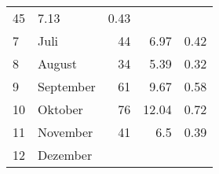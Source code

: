 \begin{longtable}{lXrrr}
       \num{45} &
       \num[round-mode=places,round-precision=2]{7.13} &
         \num[round-mode=places,round-precision=2]{0.43} \\

     7 &
     \multicolumn{1}{X}{ Juli   } &


       \num{44} &
       \num[round-mode=places,round-precision=2]{6.97} &
         \num[round-mode=places,round-precision=2]{0.42} \\

     8 &
     \multicolumn{1}{X}{ August   } &


       \num{34} &
       \num[round-mode=places,round-precision=2]{5.39} &
         \num[round-mode=places,round-precision=2]{0.32} \\

     9 &
     \multicolumn{1}{X}{ September   } &


       \num{61} &
       \num[round-mode=places,round-precision=2]{9.67} &
         \num[round-mode=places,round-precision=2]{0.58} \\

     10 &
     \multicolumn{1}{X}{ Oktober   } &


       \num{76} &
       \num[round-mode=places,round-precision=2]{12.04} &
         \num[round-mode=places,round-precision=2]{0.72} \\

     11 &
     \multicolumn{1}{X}{ November   } &


       \num{41} &
       \num[round-mode=places,round-precision=2]{6.5} &
         \num[round-mode=places,round-precision=2]{0.39} \\

     12 &
     \multicolumn{1}{X}{ Dezember   } &



\end{longtable}
